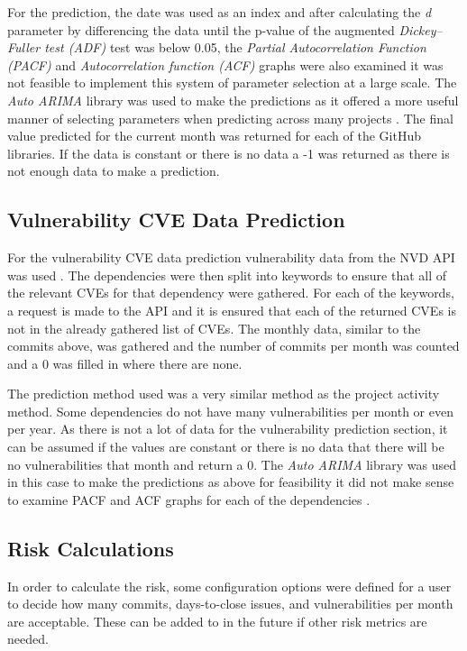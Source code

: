 \documentclass[conference]{IEEEtran}
\begin{document}
{For the prediction, the date was used as an index and after calculating the \textit{d} parameter by differencing the data until the p-value of the augmented \textit{Dickey–Fuller test (ADF)} test was below 0.05, the \textit{Partial Autocorrelation Function (PACF)} and \textit{Autocorrelation function (ACF)} graphs were also examined it was not feasible to implement this system of parameter selection at a large scale. The \textit{Auto ARIMA} library was used to make the predictions as it offered a more useful manner of selecting parameters when predicting across many projects \cite{noauthor_pmdarima_nodate}. The final value predicted for the current month was returned for each of the GitHub libraries. If the data is constant or there is no data a -1 was returned as there is not enough data to make a prediction. 

\subsection{Vulnerability CVE Data Prediction}
For the vulnerability CVE data prediction vulnerability data from the NVD API was used \cite{noauthor_vulnerability_nodate}. The dependencies were then split into keywords to ensure that all of the relevant CVEs for that dependency were gathered. For each of the keywords, a request is made to the API and it is ensured that each of the returned CVEs is not in the already gathered list of CVEs. The monthly data, similar to the commits above, was gathered and the number of commits per month was counted and a 0 was filled in where there are none. 

The prediction method used was a very similar method as the project activity method. Some dependencies do not have many vulnerabilities per month or even per year. As there is not a lot of data for the vulnerability prediction section, it can be assumed if the values are constant or there is no data that there will be no vulnerabilities that month and return a 0. The \textit{Auto ARIMA} library was used in this case to make the predictions as above for feasibility it did not make sense to examine PACF and ACF graphs for each of the dependencies \cite{noauthor_pmdarima_nodate}. 


\subsection{Risk Calculations}
In order to calculate the risk, some configuration options were defined for a user to decide how many commits, days-to-close issues, and vulnerabilities per month are acceptable. These can be added to in the future if other risk metrics are needed. 

}
\end{document}
